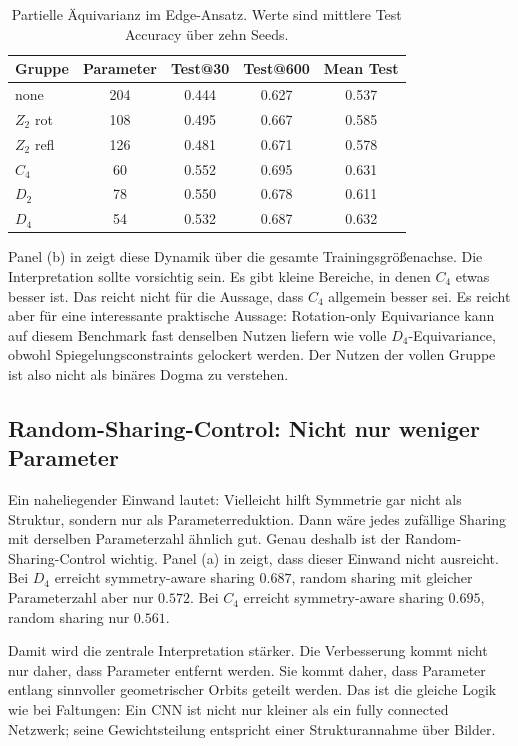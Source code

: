 \begin{table}[t]
\centering
\caption{Partielle Äquivarianz im Edge-Ansatz. Werte sind mittlere Test Accuracy über zehn Seeds.}
\label{tab:partial}
\begin{tabular}{lcccc}
\toprule
Gruppe & Parameter & Test@30 & Test@600 & Mean Test\\
\midrule
none & 204 & 0.444 & 0.627 & 0.537\\
$Z_2$ rot & 108 & 0.495 & 0.667 & 0.585\\
$Z_2$ refl & 126 & 0.481 & 0.671 & 0.578\\
$C_4$ & 60 & 0.552 & 0.695 & 0.631\\
$D_2$ & 78 & 0.550 & 0.678 & 0.611\\
$D_4$ & 54 & 0.532 & 0.687 & 0.632\\
\bottomrule
\end{tabular}
\end{table}

Panel (b) in  zeigt diese Dynamik über die gesamte Trainingsgrößenachse. Die Interpretation sollte vorsichtig sein. Es gibt kleine Bereiche, in denen $C_4$ etwas besser ist. Das reicht nicht für die Aussage, dass $C_4$ allgemein besser sei. Es reicht aber für eine interessante praktische Aussage: Rotation-only Equivariance kann auf diesem Benchmark fast denselben Nutzen liefern wie volle $D_4$-Equivariance, obwohl Spiegelungsconstraints gelockert werden. Der Nutzen der vollen Gruppe ist also nicht als binäres Dogma zu verstehen.

\subsection{Random-Sharing-Control: Nicht nur weniger Parameter}\label{subsec:random}

Ein naheliegender Einwand lautet: Vielleicht hilft Symmetrie gar nicht als Struktur, sondern nur als Parameterreduktion. Dann wäre jedes zufällige Sharing mit derselben Parameterzahl ähnlich gut. Genau deshalb ist der Random-Sharing-Control wichtig. Panel (a) in  zeigt, dass dieser Einwand nicht ausreicht. Bei $D_4$ erreicht symmetry-aware sharing $0.687$, random sharing mit gleicher Parameterzahl aber nur $0.572$. Bei $C_4$ erreicht symmetry-aware sharing $0.695$, random sharing nur $0.561$.

Damit wird die zentrale Interpretation stärker. Die Verbesserung kommt nicht nur daher, dass Parameter entfernt werden. Sie kommt daher, dass Parameter entlang sinnvoller geometrischer Orbits geteilt werden. Das ist die gleiche Logik wie bei Faltungen: Ein CNN ist nicht nur kleiner als ein fully connected Netzwerk; seine Gewichtsteilung entspricht einer Strukturannahme über Bilder.

